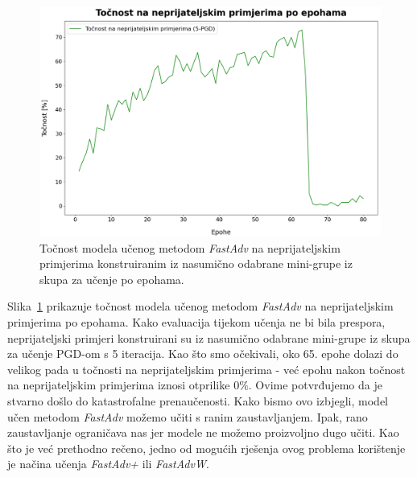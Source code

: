 \documentclass[times, utf8, zavrsni, numeric]{fer}
\begin{document}
\pagebreak
\begin{figure}[htb]
    \centering
    \includegraphics[scale=0.41]{../stats/resnet18_fast_epochs_80_lr_0.2_no_early/adv_accuracies.png}
    \caption{Točnost modela učenog metodom \textit{FastAdv} na neprijateljskim primjerima konstruiranim iz nasumično odabrane mini-grupe iz skupa za učenje po epohama.}
    \label{fig:fast_adv_acc}
\end{figure}

Slika~\ref{fig:fast_adv_acc} prikazuje točnost modela učenog metodom \textit{FastAdv} na neprijateljskim primjerima po epohama.
Kako evaluacija tijekom učenja ne bi bila prespora, neprijateljski primjeri konstruirani su iz nasumično odabrane mini-grupe iz skupa za učenje PGD-om s 5 iteracija.
Kao što smo očekivali, oko 65. epohe dolazi do velikog pada u točnosti na neprijateljskim primjerima - već epohu nakon točnost na neprijateljskim primjerima iznosi otprilike $0\%$.
Ovime potvrđujemo da je stvarno došlo do katastrofalne prenaučenosti. Kako bismo ovo izbjegli, model učen metodom \textit{FastAdv} možemo učiti s ranim zaustavljanjem. 
Ipak, rano zaustavljanje ograničava nas jer modele ne možemo proizvoljno dugo učiti. 
Kao što je već prethodno rečeno, jedno od mogućih rješenja ovog problema korištenje je načina učenja \textit{FastAdv+} ili \textit{FastAdvW}.
\end{document}
